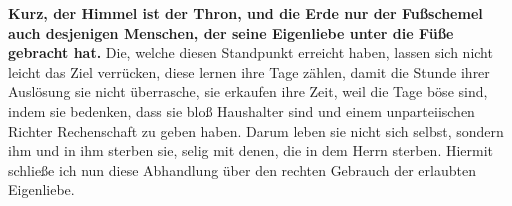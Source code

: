 \medskip

\textbf{Kurz, der Himmel ist der Thron, und die Erde nur der Fußschemel auch
desjenigen
Menschen, der seine Eigenliebe unter die Füße gebracht hat.} Die, welche diesen
Standpunkt erreicht haben, lassen sich nicht leicht das Ziel verrücken, diese
lernen ihre Tage zählen, damit die Stunde ihrer Auslösung sie nicht überrasche,
sie erkaufen ihre Zeit, weil die Tage böse sind,
indem
sie bedenken, dass sie bloß Haushalter sind und einem unparteiischen Richter
Rechenschaft zu geben haben. Darum leben sie nicht sich selbst, sondern ihm und
in ihm sterben sie, selig mit denen, die in dem Herrn sterben. Hiermit schließe
ich nun diese Abhandlung über den rechten Gebrauch der erlaubten Eigenliebe.









